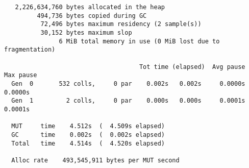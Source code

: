 \begin{verbatim}
   2,226,634,760 bytes allocated in the heap
         494,736 bytes copied during GC
          72,496 bytes maximum residency (2 sample(s))
          30,152 bytes maximum slop
               6 MiB total memory in use (0 MiB lost due to fragmentation)

                                     Tot time (elapsed)  Avg pause  Max pause
  Gen  0       532 colls,     0 par    0.002s   0.002s     0.0000s    0.0000s
  Gen  1         2 colls,     0 par    0.000s   0.000s     0.0001s    0.0001s

  MUT     time    4.512s  (  4.509s elapsed)
  GC      time    0.002s  (  0.002s elapsed)
  Total   time    4.514s  (  4.520s elapsed)

  Alloc rate    493,545,911 bytes per MUT second
\end{verbatim}
